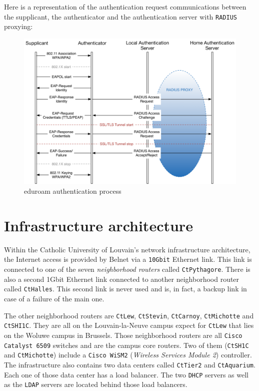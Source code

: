 Here is a representation of the authentication request communications between the supplicant, the authenticator and the authentication server with \texttt{RADIUS} proxying:
\begin{figure}[H]
	\center
	\includegraphics[width=.9\linewidth]{Pictures/chapter2/eduroam1.png}
	\caption{eduroam authentication process}
\end{figure}

\section{Infrastructure architecture}
Within the Catholic University of Louvain's network infrastructure architecture, the Internet access is provided by Belnet via a \texttt{10Gbit} Ethernet link. This link is connected to one of the seven \textit{neighborhood routers} called \texttt{CtPythagore}. There is also a second 1Gbit Ethernet link connected to another neighborhood router called \texttt{CtHalles}. This second link is never used and is, in fact, a backup link in case of a failure of the main one.

The other neighborhood routers are \texttt{CtLew}, \texttt{CtStevin}, \texttt{CtCarnoy}, \texttt{CtMichotte} and \texttt{CtSHI1C}. They are all on the Louvain-la-Neuve campus expect for \texttt{CtLew} that lies on the Woluwe campus in Brussels. Those neighborhood routers are all \texttt{Cisco Catalyst 6509} switches and are the campus core routers. Two of them (\texttt{CtSH1C} and \texttt{CtMichotte}) include a \texttt{Cisco WiSM2} (\textit{Wireless Services Module 2}) controller. The infrastructure also contains two data centers called \texttt{CtTier2} and \texttt{CtAquarium}. Each one of those data center has a load balancer. The two \texttt{DHCP} servers as well as the \texttt{LDAP} servers are located behind those load balancers.

